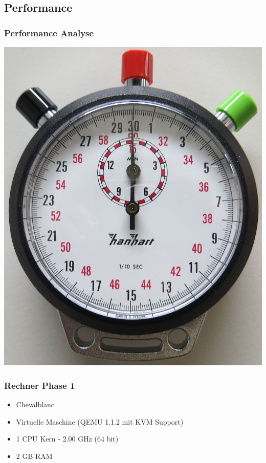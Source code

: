 \subsection{Performance}

\begin{frame}
\begin{center}
\frametitle {Performance Analyse}
\includegraphics[scale=0.4]{performance/clock}
\end{center}
\end{frame}

\begin{frame}
\frametitle{Rechner Phase 1}
\begin{itemize}
	\item Chevalblanc
	\item Virtuelle Maschine (QEMU 1.1.2 mit KVM Support)
	\item 1 CPU Kern - 2.00 GHz (64 bit)
	\item 2 GB RAM
	
\end{itemize}
\end{frame}

